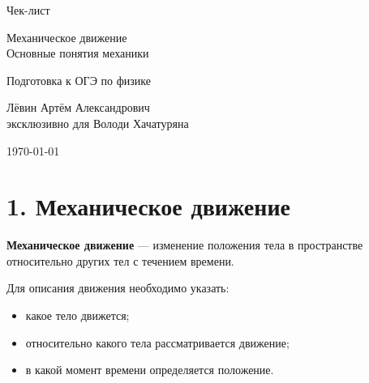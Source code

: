\documentclass[a4paper,12pt]{article}
\begin{document}

\begin{titlepage}
\centering
\vspace*{2cm}

{\Huge\color{darkaccent} Чек-лист\par}
\vspace{0.7cm}

{\LARGE Механическое движение\\
Основные понятия механики\par}

\vspace{1.5cm}

{\large Подготовка к ОГЭ по физике\par}

\vspace{1cm}

{\large Лёвин Артём Александрович\\
эксклюзивно для Володи Хачатуряна\par}

\vfill

{\large \today\par}

\vspace{1.5cm}


\end{titlepage}


\section*{1. Механическое движение}

\textbf{Механическое движение} --- изменение положения тела
в пространстве относительно других тел с течением времени.

Для описания движения необходимо указать:

\begin{itemize}
    \item какое тело движется;
    \item относительно какого тела рассматривается движение;
    \item в какой момент времени определяется положение.
\end{itemize}
\end{document}
